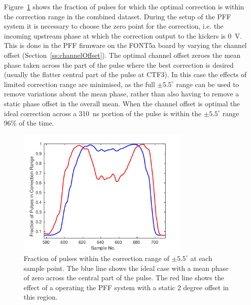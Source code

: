 Figure~\ref{f:longFF_fractInRange} shows the fraction of pulses for which the optimal correction is within the correction range in the combined dataset. During the setup of the PFF system it is necessary to choose the zero point for the correction, i.e. the incoming upstream phase at which the correction output to the kickers is 0~V. This is done in the PFF firmware on the FONT5a board by varying the channel offset (Section~\ref{ss:channelOffset}). 
The optimal channel offset zeroes the mean phase taken across the part of the pulse where the best correction is desired (usually the flatter central part of the pulse at CTF3). In this case the effects of limited correction range are minimised, as the full \(\pm5.5^\circ\) range can be used to remove variations about the mean phase, rather than also having to remove a static phase offset in the overall mean. 
When the channel offset is optimal the ideal correction across a 310~ns portion of the pulse is within the \(\pm5.5^\circ\) range 96\% of the time.

\begin{figure}
  \centering
  \includegraphics[width=0.75\textwidth]{Figures/feedforward/longFF_fractInRange}
  \caption{Fraction of pulses within the correction range of \(\pm 5.5^\circ\) at each sample point. The blue line shows the ideal case with a mean phase of zero across the central part of the pulse. The red line shows the effect of a operating the PFF system with a static 2 degree offset in this region.}
  \label{f:longFF_fractInRange}
\end{figure}

